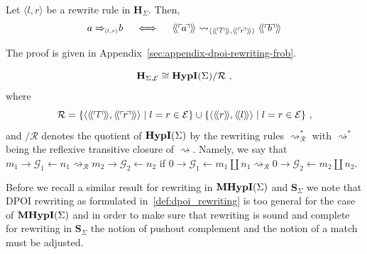 \begin{theorem} \label{theorem:dpoi_rewriting_frob}
  Let $\langle l, r \rangle$ be a rewrite rule in $\mathbf{H}_{\Sigma}$.
  Then,
  \[
  a \rewriteArrow{\langle l, r \rangle} b \quad \iff \quad \llangle \corner{a} \rrangle \rightsquigarrow_{\langle \llangle \corner{l} \rrangle, \llangle \corner{r} \rrangle \rangle} \llangle \corner{b} \rrangle
  \]
\end{theorem}

The proof is given in Appendix~\ref{sec:appendix-dpoi-rewriting-frob}.

\begin{corollary}
\[
\mathbf{H}_{\Sigma, \mathcal{E}} \cong \mathbf{HypI}(\Sigma) / \mathcal{R}~,
\]
where
\[
\mathcal{R} = \{ \langle \llangle \corner{l} \rrangle, \llangle \corner{r} \rrangle \rangle \mid l = r \in \mathcal{E} \} \cup \{ \langle \llangle r \rrangle, \llangle l \rrangle \rangle \mid l = r \in \mathcal{E}\}~,
\]
and $/ \mathcal{R}$ denotes the quotient of $\mathbf{HypI}(\Sigma)$ by the rewriting rules $\rightsquigarrow_\mathcal{R}^{*}$ with $\rightsquigarrow^{*}$ being the reflexive transitive closure of $\rightsquigarrow$.
Namely, we say that $m_1 \xrightarrow{} \mathcal{G}_1 \xleftarrow{} n_1 \rightsquigarrow_{\mathcal{R}} m_2 \xrightarrow{} \mathcal{G}_2 \xleftarrow{} n_2$ if $0 \xrightarrow{} \mathcal{G}_1 \xleftarrow{} m_1 \coprod n_1 \rightsquigarrow_{\mathcal{R}} 0 \xrightarrow{} \mathcal{G}_2 \xleftarrow{} m_2 \coprod n_2$.
\end{corollary}

Before we recall a similar result for rewriting in $\mathbf{MHypI}(\Sigma)$ and $\mathbf{S}_{\Sigma}$ we note that DPOI rewriting as formulated in~\cref{def:dpoi_rewriting} is too general for the case of $\mathbf{MHypI}(\Sigma)$ and in order to make sure that rewriting is sound and complete for rewriting in $\mathbf{S}_{\Sigma}$ the notion of pushout complement and the notion of a match must be adjusted.

